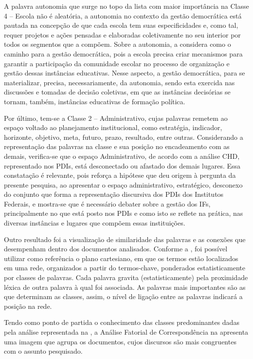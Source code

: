 \documentclass[portuguese]{textolivre}
\begin{document}
A palavra autonomia que surge no topo da lista com maior importância na Classe 4 – Escola não é aleatória, a autonomia no contexto da gestão democrática está pautada na concepção de que cada escola tem suas especificidades e, como tal, requer projetos e ações pensadas e elaboradas coletivamente no seu interior por todos os segmentos que a compõem. Sobre a autonomia, \textcite{veiga_escola_2013} a considera como o caminho para a gestão democrática, pois a escola precisa criar mecanismos para garantir a participação da comunidade escolar no processo de organização e gestão dessas instâncias educativas. Nesse aspecto, a gestão democrática, para se materializar, precisa, necessariamente, da autonomia, sendo esta exercida nas discussões e tomadas de decisão coletivas, em que as instâncias decisórias se tornam, também, instâncias educativas de formação política.

Por último, tem-se a Classe 2 – Administrativo, cujas palavras remetem ao espaço voltado ao planejamento institucional, como estratégia, indicador, horizonte, objetivo, meta, futuro, prazo, resultado, entre outras. Considerando a representação das palavras na classe e sua posição no encadeamento com as demais, verifica-se que o espaço Administrativo, de acordo com a análise CHD, representado nos PDIs, está desconectado ou afastado dos demais lugares. Essa constatação é relevante, pois reforça a hipótese que deu origem à pergunta da presente pesquisa, ao apresentar o espaço administrativo, estratégico, desconexo do conjunto que forma a representação discursiva dos PDIs dos Institutos Federais, e mostra-se que é necessário debater sobre a gestão dos IFs, principalmente no que está posto nos PDIs e como isto se reflete na prática, nas diversas instâncias e lugares que compõem essas instituições.

Outro resultado foi a visualização de similaridade das palavras e as conexões que desempenham dentro dos documentos analisados. Conforme a , foi possível utilizar como referência o plano cartesiano, em que os termos estão localizados em uma rede, organizados a partir do termos-chave, ponderados estatisticamente por classes de palavras. Cada palavra gravita (estatisticamente) pela proximidade léxica de outra palavra à qual foi associada. As palavras mais importantes são as que determinam as classes, assim, o nível de ligação entre as palavras indicará a posição na rede.

Tendo como ponto de partida o conhecimento das classes predominantes dadas pela análise representada na , a Análise Fatorial de Correspondência na  apresenta uma imagem que agrupa os documentos, cujos discursos são mais congruentes com o assunto pesquisado.
\end{document}
